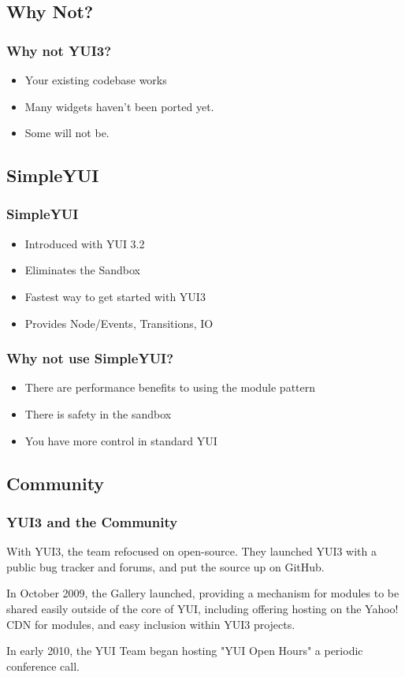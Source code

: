 \documentclass[t]{beamer}
\begin{document}
\subsection{Why Not?}
\begin{frame}
 \frametitle{Why not YUI3?}
 \begin{itemize}
  \item Your existing codebase works
  \item Many widgets haven't been ported yet.
  \item<2-> Some will not be.
 \end{itemize}
\end{frame}

\subsection{SimpleYUI}
\begin{frame}
 \frametitle{SimpleYUI}
 \begin{itemize}
  \item Introduced with YUI 3.2
  \item Eliminates the Sandbox
  \item Fastest way to get started with YUI3
  \item Provides Node/Events, Transitions, IO
 \end{itemize}
\end{frame}

\begin{frame}
 \frametitle{Why not use SimpleYUI?}
 \begin{itemize}
  \item There are performance benefits to using the module pattern
  \item There is safety in the sandbox
  \item You have more control in standard YUI
 \end{itemize}
\end{frame}

\subsection{Community}
\begin{frame}
 \frametitle{YUI3 and the Community}
 With YUI3, the team refocused on open-source. They launched YUI3 with a public bug tracker and forums, and put the source up on GitHub.

\bigskip
 In October 2009, the Gallery launched, providing a mechanism for modules to be shared easily outside of the core of YUI, including offering hosting on the Yahoo! CDN for modules, and easy inclusion within YUI3 projects.

\bigskip
 In early 2010, the YUI Team began hosting "YUI Open Hours" a periodic conference call.
\end{frame}
\end{document}
